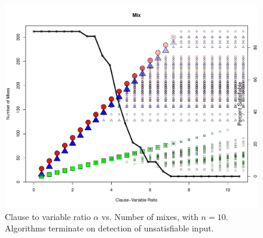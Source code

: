\begin{figure}[htdp]

\begin{center}

\includegraphics[width=1.1\textwidth]{./figures/metricOutput_n10/mixCount.pdf}

\caption{Clause to variable ratio $\alpha$ vs. Number of mixes, with $n = 10$.  Algorithms terminate on detection of unsatisfiable input. }
\label{mixFig_10}
\end{center}
\end{figure}

\FloatBarrier

